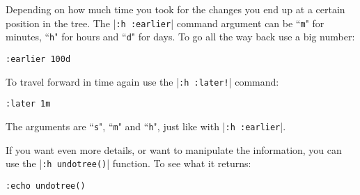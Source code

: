 Depending on how much time you took for the changes you end up at a certain position in the tree.
The |\texttt{:h :earlier}| command argument can be ``\texttt{m}" for minutes, ``\texttt{h}" for hours and ``\texttt{d}" for days.
To go all the way back use a big number:

\begin{Verbatim}[samepage=true]
 :earlier 100d
\end{Verbatim}

To travel forward in time again use the |\texttt{:h :later!}| command:

\begin{Verbatim}[samepage=true]
 :later 1m
\end{Verbatim}

The arguments are ``\texttt{s}", ``\texttt{m}" and ``\texttt{h}", just like with |\texttt{:h :earlier}|.

If you want even more details, or want to manipulate the information, you can use the |\texttt{:h undotree()}| function.
To see what it returns:

\begin{Verbatim}[samepage=true]
 :echo undotree()
\end{Verbatim}
\clearpage
